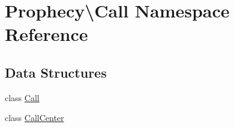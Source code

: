 \hypertarget{namespace_prophecy_1_1_call}{}\section{Prophecy\textbackslash{}Call Namespace Reference}
\label{namespace_prophecy_1_1_call}
\subsection*{Data Structures}
\begin{DoxyCompactItemize}
\item 
class \mbox{\hyperlink{class_prophecy_1_1_call_1_1_call}{Call}}
\item 
class \mbox{\hyperlink{class_prophecy_1_1_call_1_1_call_center}{Call\+Center}}
\end{DoxyCompactItemize}
